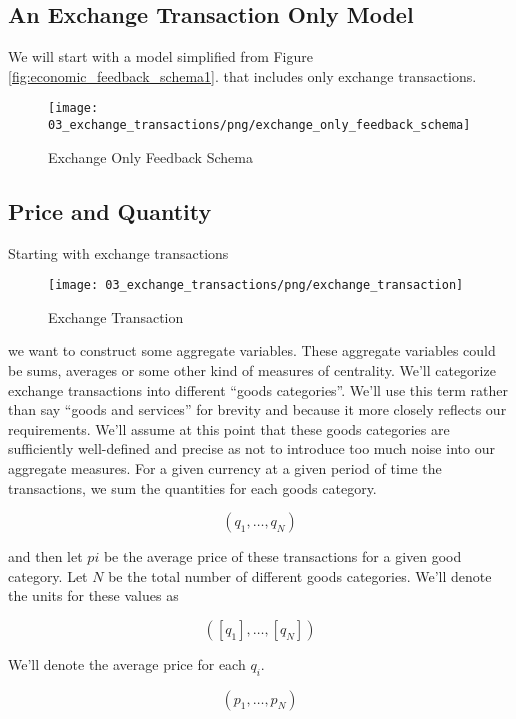 \subsection{An Exchange Transaction Only Model}

We will start with a model simplified from Figure \ref{fig:economic_feedback_schema1}. that includes only
exchange transactions.

\begin{figure}[H]
\centering
\texttt{[image: 03\_exchange\_transactions/png/exchange\_only\_feedback\_schema]}
\caption{Exchange Only Feedback Schema}
\label{fig:exchange_only_feedback_schema1}
\end{figure}

\subsection{Price and Quantity}

Starting with exchange transactions

\begin{figure}[H]
\centering
\texttt{[image: 03\_exchange\_transactions/png/exchange\_transaction]}
\caption{Exchange Transaction}
\label{fig:exchange_transaction2}
\end{figure}

we want to construct some aggregate variables. These aggregate variables could be sums, averages or
some other kind of measures of centrality. We'll categorize exchange transactions into different
``goods categories''. We'll use this term rather than say ``goods and services'' for brevity and
because it more closely reflects our requirements. We'll assume at this point that these goods
categories are sufficiently well-defined and precise as not to introduce too much noise into our
aggregate measures. For a given currency at a given period of time the transactions, we sum the
quantities for each goods category.

\[
    \left( q_1, \dots, q_N \right)
\]

and then let $pi$ be the average price of these transactions for a given good category. Let $N$ be
the total number of different goods categories. We'll denote the units for these values as

\[
    \left( \left[ q_1 \right], \dots, \left[ q_N \right] \right)
\]

We'll denote the average price for each $q_i$.

\[
    \left( p_1, \dots, p_N \right)
\]









